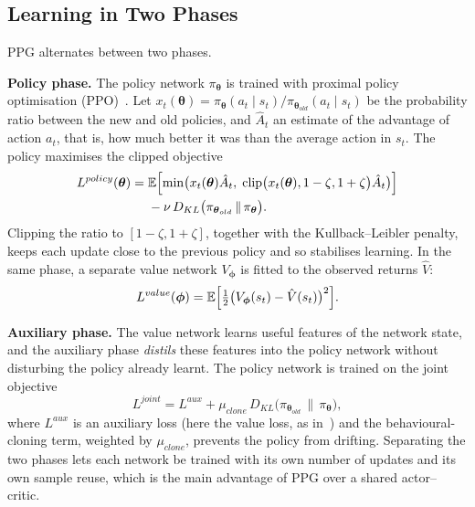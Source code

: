 \subsection{Learning in Two Phases}
PPG alternates between two phases.

\textbf{Policy phase.} The policy network $\pi_{\boldsymbol{\theta}}$ is trained with proximal policy optimisation (PPO)~\cite{ml_schulman2017ppo}. Let $x_t(\boldsymbol{\theta})=\pi_{\boldsymbol{\theta}}(a_t\mid s_t)/\pi_{\boldsymbol{\theta}_{old}}(a_t\mid s_t)$ be the probability ratio between the new and old policies, and $\hat{A}_t$ an estimate of the advantage of action $a_t$, that is, how much better it was than the average action in $s_t$. The policy maximises the clipped objective
\begin{equation}
\begin{split}
  L^{policy}(\boldsymbol{\theta})={}&\mathbb{E}\Bigl[\min\bigl(x_t(\boldsymbol{\theta})\hat{A}_t,\;\mathrm{clip}\bigl(x_t(\boldsymbol{\theta}),1-\zeta,1+\zeta\bigr)\hat{A}_t\bigr)\Bigr]\\
  &-\nu\,D_{KL}\bigl(\pi_{\boldsymbol{\theta}_{old}}\,\|\,\pi_{\boldsymbol{\theta}}\bigr).
\end{split}
\end{equation}
Clipping the ratio to $[1-\zeta,1+\zeta]$, together with the Kullback--Leibler penalty, keeps each update close to the previous policy and so stabilises learning. In the same phase, a separate value network $V_{\boldsymbol{\phi}}$ is fitted to the observed returns $\hat{V}$:
\begin{equation}
  L^{value}(\boldsymbol{\phi})=\mathbb{E}\Bigl[\tfrac{1}{2}\bigl(V_{\boldsymbol{\phi}}(s_t)-\hat{V}(s_t)\bigr)^{2}\Bigr].
\end{equation}

\textbf{Auxiliary phase.} The value network learns useful features of the network state, and the auxiliary phase \emph{distils} these features into the policy network without disturbing the policy already learnt. The policy network is trained on the joint objective
\begin{equation}
  L^{joint}=L^{aux}+\mu_{clone}\,D_{KL}\bigl(\pi_{\boldsymbol{\theta}_{old}}\,\|\,\pi_{\boldsymbol{\theta}}\bigr),
\end{equation}
where $L^{aux}$ is an auxiliary loss (here the value loss, as in~\cite{ml_cobbe2021ppg}) and the behavioural-cloning term, weighted by $\mu_{clone}$, prevents the policy from drifting. Separating the two phases lets each network be trained with its own number of updates and its own sample reuse, which is the main advantage of PPG over a shared actor--critic.

